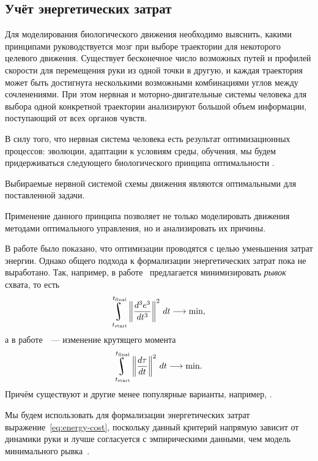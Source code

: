\documentclass[../../doc.tex]{subfiles}
\begin{document}
    \subsection{Учёт энергетических затрат}

    Для моделирования биологического движения необходимо выяснить, какими принципами руководствуется мозг при выборе траектории для некоторого целевого движения.
    Существует бесконечное число возможных путей и профилей скорости для перемещения руки из одной точки в другую,
    и каждая траектория может быть достигнута несколькими возможными комбинациями углов между сочленениями.
    При этом нервная и моторно-двигательные системы человека для выбора одной конкретной траектории анализируют большой объем информации, поступающий от всех органов чувств.

    В силу того, что нервная система человека есть результат оптимизационных процессов:
    эволюции, адаптации к условиям среды, обучения,
    мы будем придерживаться следующего биологического принципа оптимальности \cite{rashevsky1960}.
    
    \begin{assertion}
        Выбираемые нервной системой схемы движения являются оптимальными для поставленной задачи.
    \end{assertion}
    
    Применение данного принципа позволяет не только моделировать движения методами оптимального управления, но и анализировать их причины.

    В работе \cite{todorov2002} было показано, что оптимизации проводятся с целью уменьшения затрат энергии.
    Однако общего подхода к формализации энергетических затрат пока не выработано.
    Так, например, в работе~\cite{hogan1984} предлагается минимизировать \textit{рывок} схвата, то есть
    $$
        \uint\limits_{t_{\textnormal{start}}}^{t_{\textnormal{final}}}\left\|
            \frac{d^3e^3}{dt^3}
        \right\|^2\, dt \longrightarrow \textnormal{min},
    $$
    а в работе~\cite{uno1989}~--- изменение крутящего момента
    \begin{equation}\label{eq:energy-cost}
        \uint\limits_{t_{\textnormal{start}}}^{t_{\textnormal{final}}}\left\|
            \frac{d\tau}{dt}
        \right\|^2\, dt \longrightarrow \textnormal{min}.
    \end{equation}
    Причём существуют и другие менее популярные варианты, например, \cite{harris1998}.
    
    Мы будем использовать для формализации энергетических затрат выражение~\eqref{eq:energy-cost},
    поскольку данный критерий напрямую зависит от динамики руки и лучше согласуется с эмпирическими данными,
    чем модель минимального рывка~\cite{breteler2002}.
    
    \ifSubfilesClassLoaded{
        \nocite{*}
        \clearpage
        
        
    }{}
\end{document}
